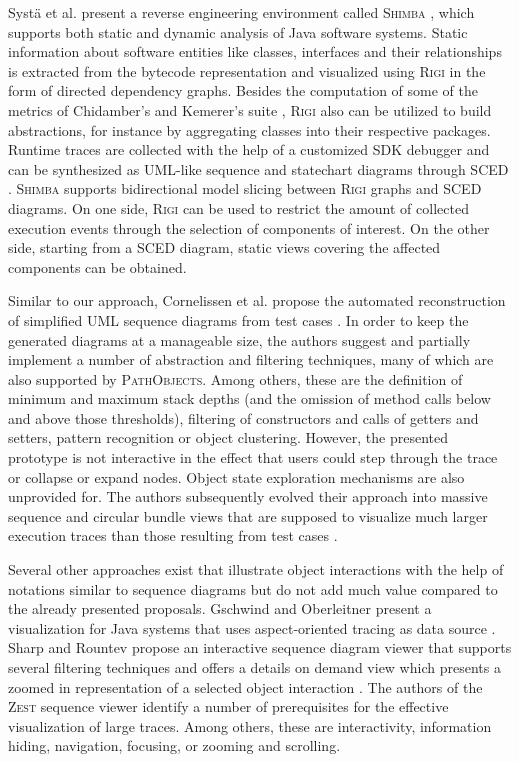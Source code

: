 Systä et al. present a reverse engineering environment called \textsc{Shimba} \cite{systa_shimba_2001}, which supports both static and dynamic analysis of Java software systems.
Static information about software entities like classes, interfaces and their relationships is extracted from the bytecode representation and visualized using \textsc{Rigi} \cite{muller_understanding_1993} in the form of directed dependency graphs.
Besides the computation of some of the metrics of Chidamber's and Kemerer's suite \cite{chidamber_metrics_1994}, \textsc{Rigi} also can be utilized to build abstractions, for instance by aggregating classes into their respective packages.
Runtime traces are collected with the help of a customized SDK debugger and can be synthesized as UML-like sequence and statechart diagrams through \textsc{SCED} \cite{koskimies_automated_1998,systa_understanding_2000}.
\textsc{Shimba} supports bidirectional model slicing between \textsc{Rigi} graphs and \textsc{SCED} diagrams.
On one side, \textsc{Rigi} can be used to restrict the amount of collected execution events through the selection of components of interest.
On the other side, starting from a \textsc{SCED} diagram, static views covering the affected components can be obtained.

Similar to our approach, Cornelissen et al. propose the automated reconstruction of simplified UML sequence diagrams from test cases \cite{cornelissen_visualizing_2007}.
In order to keep the generated diagrams at a manageable size, the authors suggest and partially implement a number of abstraction and filtering techniques, many of which are also supported by \textsc{PathObjects}.
Among others, these are the definition of minimum and maximum stack depths (and the omission of method calls below and above those thresholds), filtering of constructors and calls of getters and setters, pattern recognition or object clustering.
However, the presented prototype is not interactive in the effect that users could step through the trace or collapse or expand nodes.
Object state exploration mechanisms are also unprovided for.
The authors subsequently evolved their approach into massive sequence and circular bundle views that are supposed to visualize much larger execution traces than those resulting from test cases \cite{cornelissen_understanding_2007, cornelissen_execution_2008}.

Several other approaches exist that illustrate object interactions with the help of notations similar to sequence diagrams but do not add much value compared to the already presented proposals.
Gschwind and Oberleitner present a visualization for Java systems that uses aspect-oriented tracing as data source \cite{gschwind_improving_2003}.
Sharp and Rountev propose an interactive sequence diagram viewer that supports several filtering techniques and offers a details on demand view which presents a zoomed in representation of a selected object interaction \cite{sharp_interactive_2005}.
The authors of the \textsc{Zest} sequence viewer \cite{bennett_working_2007} identify a number of prerequisites for the effective visualization of large traces. Among others, these are interactivity, information hiding, navigation, focusing, or zooming and scrolling.

